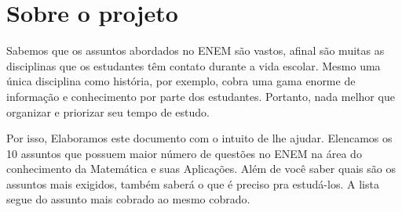 \chapter*{Sobre o projeto}
Sabemos que os assuntos abordados no ENEM são vastos, afinal são muitas as disciplinas que os estudantes têm contato durante a vida escolar. Mesmo uma única disciplina como história, por exemplo, cobra uma gama enorme de informação e conhecimento por parte dos estudantes. Portanto, nada melhor que organizar e priorizar seu tempo de estudo.

Por isso, Elaboramos este documento com o intuito de lhe ajudar. Elencamos os 10 assuntos que possuem maior número de questões no ENEM na área do conhecimento da Matemática e suas Aplicações. Além de você saber quais são os assuntos mais exigidos, também saberá o que é preciso pra estudá-los. A lista segue do assunto mais cobrado ao mesmo cobrado.